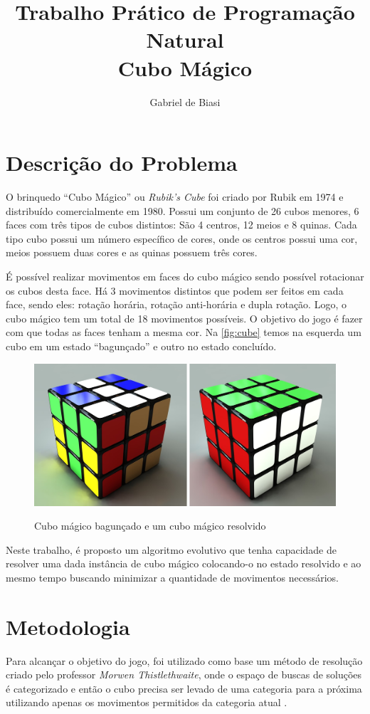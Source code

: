\documentclass[12pt]{article}
\title{Trabalho Prático de Programação Natural\\Cubo Mágico}
\author{Gabriel de Biasi\inst{1}}
\begin{document}
\maketitle

\section{Descrição do Problema}
  O brinquedo ``Cubo Mágico'' ou \textit{Rubik's Cube} foi criado por Rubik em 1974 e distribuído comercialmente em 1980. Possui um conjunto de 26 cubos menores, 6 faces com três tipos de cubos distintos: São 4 centros, 12 meios e 8 quinas. Cada tipo cubo possui um número específico de cores, onde os centros possui uma cor, meios possuem duas cores e as quinas possuem três cores.

  É possível realizar movimentos em faces do cubo mágico sendo possível rotacionar os cubos desta face. Há 3 movimentos distintos que podem ser feitos em cada face, sendo eles: rotação horária, rotação anti-horária e dupla rotação. Logo, o cubo mágico tem um total de 18 movimentos possíveis. O objetivo do jogo é fazer com que todas as faces tenham a mesma cor. Na \autoref{fig:cube} temos na esquerda um cubo em um estado ``bagunçado'' e outro no estado concluído.


  \begin{figure}[!ht]
    \centering
    \caption{Cubo mágico bagunçado e um cubo mágico resolvido}
    \includegraphics[scale=0.3]{images/cube.png}
    \label{fig:cube}
  \end{figure}

  Neste trabalho, é proposto um algoritmo evolutivo que tenha capacidade de resolver uma dada instância de cubo mágico colocando-o no estado resolvido e ao mesmo tempo buscando minimizar a quantidade de movimentos necessários.

\section{Metodologia}
  Para alcançar o objetivo do jogo, foi utilizado como base um método de resolução criado pelo professor \textit{Morwen Thistlethwaite}, onde o espaço de buscas de soluções é categorizado e então o cubo precisa ser levado de uma categoria para a próxima utilizando apenas os movimentos permitidos da categoria atual \cite{thistlethwaite}.
\end{document}
